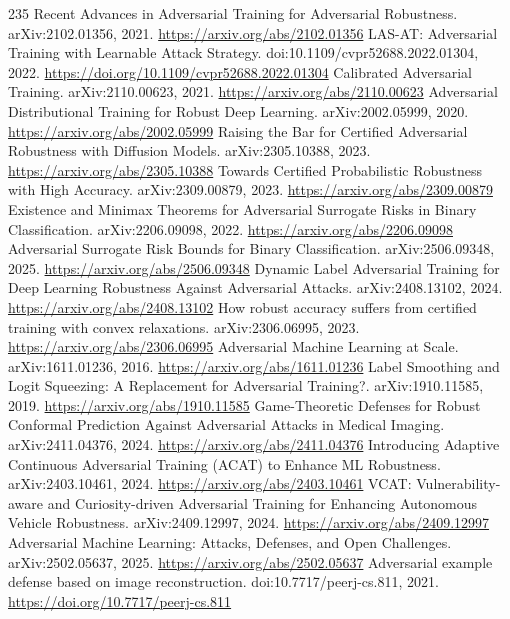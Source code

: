 \documentclass[11pt]{article}
\begin{document}
\begin{thebibliography}{235}
 Recent Advances in Adversarial Training for Adversarial Robustness. arXiv:2102.01356, 2021. \url{https://arxiv.org/abs/2102.01356}
 LAS-AT: Adversarial Training with Learnable Attack Strategy. doi:10.1109/cvpr52688.2022.01304, 2022. \url{https://doi.org/10.1109/cvpr52688.2022.01304}
 Calibrated Adversarial Training. arXiv:2110.00623, 2021. \url{https://arxiv.org/abs/2110.00623}
 Adversarial Distributional Training for Robust Deep Learning. arXiv:2002.05999, 2020. \url{https://arxiv.org/abs/2002.05999}
 Raising the Bar for Certified Adversarial Robustness with Diffusion Models. arXiv:2305.10388, 2023. \url{https://arxiv.org/abs/2305.10388}
 Towards Certified Probabilistic Robustness with High Accuracy. arXiv:2309.00879, 2023. \url{https://arxiv.org/abs/2309.00879}
 Existence and Minimax Theorems for Adversarial Surrogate Risks in Binary Classification. arXiv:2206.09098, 2022. \url{https://arxiv.org/abs/2206.09098}
 Adversarial Surrogate Risk Bounds for Binary Classification. arXiv:2506.09348, 2025. \url{https://arxiv.org/abs/2506.09348}
 Dynamic Label Adversarial Training for Deep Learning Robustness Against Adversarial Attacks. arXiv:2408.13102, 2024. \url{https://arxiv.org/abs/2408.13102}
 How robust accuracy suffers from certified training with convex relaxations. arXiv:2306.06995, 2023. \url{https://arxiv.org/abs/2306.06995}
 Adversarial Machine Learning at Scale. arXiv:1611.01236, 2016. \url{https://arxiv.org/abs/1611.01236}
 Label Smoothing and Logit Squeezing: A Replacement for Adversarial Training?. arXiv:1910.11585, 2019. \url{https://arxiv.org/abs/1910.11585}
 Game-Theoretic Defenses for Robust Conformal Prediction Against Adversarial Attacks in Medical Imaging. arXiv:2411.04376, 2024. \url{https://arxiv.org/abs/2411.04376}
 Introducing Adaptive Continuous Adversarial Training (ACAT) to Enhance ML Robustness. arXiv:2403.10461, 2024. \url{https://arxiv.org/abs/2403.10461}
 VCAT: Vulnerability-aware and Curiosity-driven Adversarial Training for Enhancing Autonomous Vehicle Robustness. arXiv:2409.12997, 2024. \url{https://arxiv.org/abs/2409.12997}
 Adversarial Machine Learning: Attacks, Defenses, and Open Challenges. arXiv:2502.05637, 2025. \url{https://arxiv.org/abs/2502.05637}
 Adversarial example defense based on image reconstruction. doi:10.7717/peerj-cs.811, 2021. \url{https://doi.org/10.7717/peerj-cs.811}

\end{thebibliography}
\end{document}
